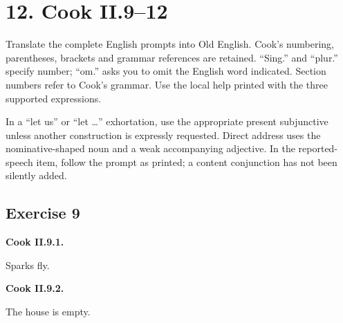 \section*{12. Cook II.9–12}

Translate the complete English prompts into Old English. Cook’s numbering, parentheses, brackets and grammar references are retained. “Sing.” and “plur.” specify number; “om.” asks you to omit the English word indicated. Section numbers refer to Cook’s grammar. Use the local help printed with the three supported expressions.

In a “let us” or “let …” exhortation, use the appropriate present subjunctive unless another construction is expressly requested. Direct address uses the nominative-shaped noun and a weak accompanying adjective. In the reported-speech item, follow the prompt as printed; a content conjunction has not been silently added.

\subsection*{Exercise 9}

\par\begin{minipage}{\linewidth}\raggedright
\textbf{Cook II.9.1.}

Sparks fly.

\end{minipage}\par\addvspace{4pt}

\par\begin{minipage}{\linewidth}\raggedright
\textbf{Cook II.9.2.}

The house is empty.

\end{minipage}\par\addvspace{4pt}

